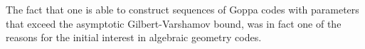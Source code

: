 The fact that one is able to construct sequences of Goppa codes with parameters that exceed the asymptotic Gilbert-Varshamov bound, was in fact one of the reasons for the initial interest in algebraic geometry codes.
